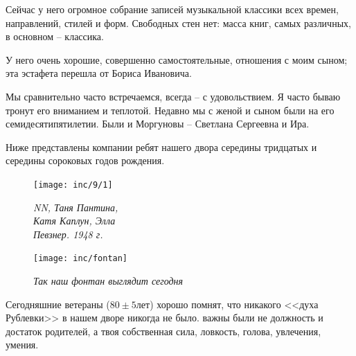 Сейчас у него огромное собрание записей музыкальной классики всех времен, направлений, стилей и форм. Свободных стен нет: масса книг, самых различных, в основном – классика.

У него очень хорошие, совершенно самостоятельные, отношения с моим сыном; эта эстафета перешла от Бориса Ивановича.

Мы сравнительно часто встречаемся, всегда – с удовольствием. Я часто бываю тронут его вниманием и теплотой. Недавно мы с женой и сыном были на его семидесятипятилетии. Были и Моргуновы – Светлана Сергеевна и Ира.


\indent

Ниже представлены компании ребят нашего двора середины тридцатых и середины сороковых годов рождения.

\begin{figure}[h!]
    \noindent
    \begin{minipage}[t][65mm]{45mm}
        \texttt{[image: inc/9/1]}
        
        \begin{footnotesize}\textit{NN, Таня Пантина, \\ Катя Каплун, Элла \\ Певзнер. 1948 г.}\end{footnotesize}
    \end{minipage}
    \hfill
    \begin{minipage}[t][65mm]{61mm}
        \texttt{[image: inc/fontan]} \begin{footnotesize}\textit{Так наш фонтан выглядит сегодня}\end{footnotesize}
    \end{minipage}
\end{figure}

\vspace{-20pt}

\begin{figure}[h!]
    

\end{figure}

\newpage

Сегодняшние ветераны ($80\pm5$лет) хорошо помнят, что никакого <<духа Рублевки>> в нашем дворе никогда не было. важны были не должность и достаток родителей, а твоя собственная сила, ловкость, голова, увлечения, умения.

